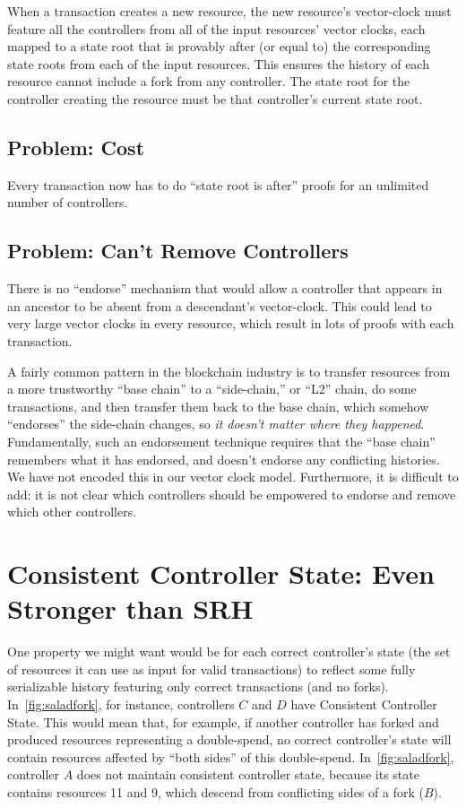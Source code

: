 \documentclass[a4paper,USenglish,cleveref, autoref, thm-restate, anonymous]{lipics-v2021}
\begin{document}
When a transaction creates a new resource, the new resource's vector-clock must feature all the controllers from all of the input resources' vector clocks, each mapped to a state root that is provably after (or equal to) the corresponding state roots from each of the input resources. 
This ensures the history of each resource cannot include a fork from any controller. 
The state root for the controller creating the resource must be that controller's current state root. 

\subsection{Problem: Cost}
Every transaction now has to do ``state root is after'' proofs for an unlimited number of controllers.

\subsection{Problem: Can't Remove Controllers}
There is no ``endorse'' mechanism that would allow a controller that appears in an ancestor to be absent from a descendant's vector-clock. 
This could lead to very large vector clocks in every resource, which result in lots of proofs with each transaction.

A fairly common pattern in the blockchain industry is to transfer resources from a more trustworthy ``base chain'' to a ``side-chain,'' or ``L2'' chain, do some transactions, and then transfer them back to the base chain, which somehow ``endorses'' the side-chain changes, so \textit{it doesn't matter where they happened}. 
Fundamentally, such an endorsement technique requires that the ``base chain'' remembers what it has endorsed, and doesn't endorse any conflicting histories. 
We have not encoded this in our vector clock model.
Furthermore, it is difficult to add: it is not clear which controllers should be empowered to endorse and remove which other controllers. 




\section{Consistent Controller State: Even Stronger than SRH}
\label{sec:consistentcontrollerstate}
One property we might want would be for each correct controller's state (the set of resources it can use as input for valid transactions) to reflect some fully serializable history featuring only correct transactions (and no forks). 
In~\cref{fig:saladfork}, for instance, controllers $C$ and $D$ have Consistent Controller State.
This would mean that, for example, if another controller has forked and produced resources representing a double-spend, no correct controller's state will contain resources affected by ``both sides'' of this double-spend.
In~\cref{fig:saladfork}, controller $A$ does not maintain consistent controller state, because its state contains resources 11 and 9, which descend from conflicting sides of a fork ($B$).
\end{document}
